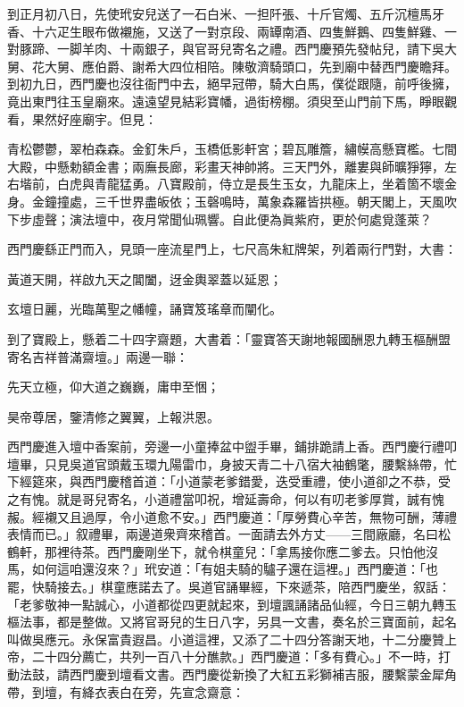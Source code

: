 到正月初八日，先使玳安兒送了一石白米、一担阡張、十斤官燭、五斤沉檀馬牙香、十六疋生眼布做襯施，又送了一對京段、兩罈南酒、四隻鮮鵝、四隻鮮雞、一對豚蹄、一脚羊肉、十兩銀子，與官哥兒寄名之禮。西門慶預先發帖兒，請下吳大舅、花大舅、應伯爵、謝希大四位相陪。陳敬濟騎頭口，先到廟中替西門慶瞻拜。到初九日，西門慶也沒往衙門中去，絕早冠帶，騎大白馬，僕從跟隨，前呼後擁，竟出東門往玉皇廟來。遠遠望見結彩寶幡，過街榜棚。須臾至山門前下馬，睜眼觀看，果然好座廟宇。但見：

\begin{myquote}
青松鬱鬱，翠柏森森。金釘朱戶，玉橋低影軒宮；碧瓦雕簷，繡幙高懸寶檻。七間大殿，中懸勅額金書；兩廡長廊，彩畫天神帥將。三天門外，離婁與師曠猙獰，左右堦前，白虎與青龍猛勇。八寶殿前，侍立是長生玉女，九龍床上，坐着箇不壞金身。金鐘撞處，三千世界盡皈依；玉磬鳴時，萬象森羅皆拱極。朝天閣上，天風吹下步虛聲；演法壇中，夜月常聞仙珮響。自此便為眞紫府，更於何處覓蓬萊？
\end{myquote}

西門慶繇正門而入，見頭一座流星門上，七尺高朱紅牌架，列着兩行門對，大書：

\begin{myquote}
黃道天開，祥啟九天之閶闔，迓金輿翠蓋以延恩；

玄壇日麗，光臨萬聖之幡幢，誦寶笈瑤章而闡化。
\end{myquote}

到了寶殿上，懸着二十四字齋題，大書着：「靈寶答天謝地報國酬恩九轉玉樞酬盟寄名吉祥普滿齋壇。」兩邊一聯：

\begin{myquote}
先天立極，仰大道之巍巍，庸申至悃；

昊帝尊居，鑒清修之翼翼，上報洪恩。
\end{myquote}

西門慶進入壇中香案前，旁邊一小童捧盆中盥手畢，鋪排跪請上香。西門慶行禮叩壇畢，只見吳道官頭戴玉環九陽雷巾，身披天青二十八宿大袖鶴氅，腰繫絲帶，忙下經筵來，與西門慶稽首道：「小道蒙老爹錯愛，迭受重禮，使小道卻之不恭，受之有愧。就是哥兒寄名，小道禮當叩祝，增延壽命，何以有叨老爹厚賞，誠有愧赧。經襯又且過厚，令小道愈不安。」西門慶道：「厚勞費心辛苦，無物可酬，薄禮表情而已。」叙禮畢，兩邊道衆齊來稽首。一面請去外方丈——三間廠廳，名曰松鶴軒，那裡待茶。西門慶剛坐下，就令棋童兒：「拿馬接你應二爹去。只怕他沒馬，如何這咱還沒來？」玳安道：「有姐夫騎的驢子還在這裡。」西門慶道：「也罷，快騎接去。」棋童應諾去了。吳道官誦畢經，下來遞茶，陪西門慶坐，叙話：「老爹敬神一點誠心，小道都從四更就起來，到壇諷誦諸品仙經，今日三朝九轉玉樞法事，都是整做。又將官哥兒的生日八字，另具一文書，奏名於三寶面前，起名叫做吳應元。永保富貴遐昌。小道這裡，又添了二十四分答謝天地，{}十二分慶贊上帝，二十四分薦亡，共列一百八十分醮款。」西門慶道：「多有費心。」不一時，打動法鼓，請西門慶到壇看文書。西門慶從新換了大紅五彩獅補吉服，腰繫蒙金犀角帶，到壇，有絳衣表白在旁，先宣念齋意：

